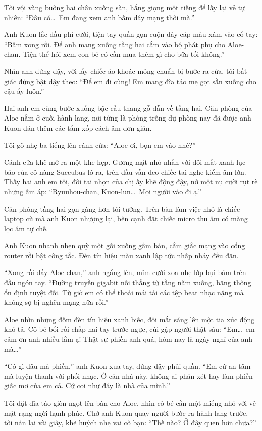 ﻿\documentclass[../main.tex]{subfiles}
\begin{document}
Tôi vội vàng buông hai chân xuống sàn, hắng giọng một tiếng để lấy lại vẻ tự nhiên: ``Đâu có\dots\ Em đang xem anh bấm dây mạng thôi mà.''

Anh Kuon lắc đầu phì cười, tiện tay quấn gọn cuộn dây cáp màu xám vào cổ tay: ``Bấm xong rồi. Để anh mang xuống tầng hai cắm vào bộ phát phụ cho Aloe-chan. Tiện thể hỏi xem con bé có cần mua thêm gì cho bữa tối không.''

Nhìn anh đứng dậy, với lấy chiếc áo khoác mỏng chuẩn bị bước ra cửa, tôi bất giác đứng bật dậy theo: ``Để em đi cùng! Em mang đĩa táo mẹ gọt sẵn xuống cho cậu ấy luôn.''

Hai anh em cùng bước xuống bậc cầu thang gỗ dẫn về tầng hai. Căn phòng của Aloe nằm ở cuối hành lang, nơi từng là phòng trống dự phòng nay đã được anh Kuon dán thêm các tấm xốp cách âm đơn giản.

Tôi gõ nhẹ ba tiếng lên cánh cửa: ``Aloe ơi, bọn em vào nhé?''

Cánh cửa khẽ mở ra một khe hẹp. Gương mặt nhỏ nhắn với đôi mắt xanh lục bảo của cô nàng Succubus ló ra, trên đầu vẫn đeo chiếc tai nghe kiểm âm lớn. Thấy hai anh em tôi, đôi tai nhọn của chị ấy khẽ động đậy, nở một nụ cười rụt rè nhưng ấm áp: ``Ryuuhou-chan, Kuon-lun\dots\ Mọi người vào đi ạ.''

Căn phòng tầng hai gọn gàng hơn tôi tưởng. Trên bàn làm việc nhỏ là chiếc laptop cũ mà anh Kuon nhượng lại, bên cạnh đặt chiếc micro thu âm có màng lọc âm tự chế.

Anh Kuon nhanh nhẹn quỳ một gối xuống gầm bàn, cắm giắc mạng vào cổng router rồi bật công tắc. Đèn tín hiệu màu xanh lập tức nhấp nháy đều đặn.

``Xong rồi đấy Aloe-chan,'' anh ngẩng lên, mỉm cười xoa nhẹ lớp bụi bám trên đầu ngón tay. ``Đường truyền gigabit nối thẳng từ tầng năm xuống, băng thông ổn định tuyệt đối. Từ giờ em có thể thoải mái tải các tệp beat nhạc nặng mà không sợ bị nghẽn mạng nữa rồi.''

Aloe nhìn những đốm đèn tín hiệu xanh biếc, đôi mắt sáng lên một tia xúc động khó tả. Cô bé bối rối chắp hai tay trước ngực, cúi gập người thật sâu: ``Em\dots\ em cảm ơn anh nhiều lắm ạ! Thật sự phiền anh quá, hôm nay là ngày nghỉ của anh mà\dots''

``Có gì đâu mà phiền,'' anh Kuon xua tay, đứng dậy phủi quần. ``Em cứ an tâm mà luyện thanh với phối nhạc. Ở căn nhà này, không ai phán xét hay làm phiền giấc mơ của em cả. Cứ coi như đây là nhà của mình.''

Tôi đặt đĩa táo giòn ngọt lên bàn cho Aloe, nhìn cô bé cắn một miếng nhỏ với vẻ mặt rạng ngời hạnh phúc. Chờ anh Kuon quay người bước ra hành lang trước, tôi nán lại vài giây, khẽ huých nhẹ vai cô bạn: ``Thế nào? Ở đây quen hơn chưa?''
\end{document}
